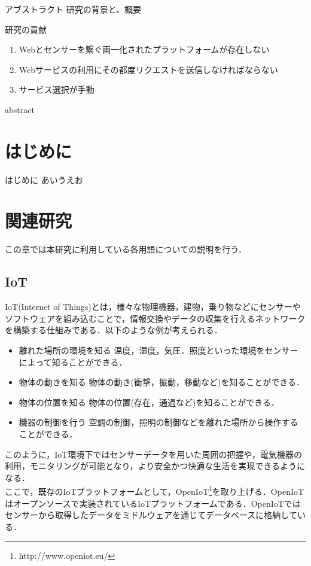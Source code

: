 \documentclass{kuisthesis}			%
\date{平成28年2月6日}				%
\begin{document}
\maketitle					%

\begin{jabstract}				%
アブストラクト
研究の背景と、概要

研究の貢献
\begin{enumerate}
\item
Webとセンサーを繋ぐ画一化されたプラットフォームが存在しない
\item
Webサービスの利用にその都度リクエストを送信しなければならない
\item
サービス選択が手動
\end{enumerate}
\end{jabstract}
\begin{eabstract}				%
abstract

\end{eabstract}

\tableofcontents				%

\section{はじめに}\label{sec-intro}		%
はじめに
あいうえお

\section{関連研究}\label{sec-structure}
この章では本研究に利用している各用語についての説明を行う．

\subsection{IoT}\label{subsec-abstract}
IoT(Internet of Things)とは，様々な物理機器，建物，乗り物などにセンサーやソフトウェアを組み込むことで，情報交換やデータの収集を行えるネットワークを構築する仕組みである．以下のような例が考えられる．
\begin{itemize}
\item 離れた場所の環境を知る
温度，湿度，気圧．照度といった環境をセンサーによって知ることができる．
\item 物体の動きを知る
物体の動き(衝撃，振動，移動など)を知ることができる．
\item 物体の位置を知る
物体の位置(存在，通過など)を知ることができる．
\item 機器の制御を行う
空調の制御，照明の制御などを離れた場所から操作することができる．
\end{itemize}
このように，IoT環境下ではセンサーデータを用いた周囲の把握や，電気機器の利用，モニタリングが可能となり，より安全かつ快適な生活を実現できるようになる．\\
ここで，既存のIoTプラットフォームとして，OpenIoT\footnote{http://www.openiot.eu/}を取り上げる．OpenIoTはオープンソースで実装されているIoTプラットフォームである．OpenIoTではセンサーから取得したデータをミドルウェアを通じてデータベースに格納している．
\end{document}
